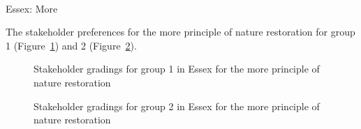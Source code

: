 \documentclass[
  12pt,
  letterpaper,
  DIV=11,
  numbers=noendperiod]{scrartcl}
\makeatletter
\let\oldparagraph\paragraph
\renewcommand{\paragraph}{
    \@ifstar
      \xxxParagraphStar
      \xxxParagraphNoStar
  }
\newcommand{\xxxParagraphStar}[1]{\oldparagraph*{#1}\mbox{}}
\newcommand{\xxxParagraphNoStar}[1]{\oldparagraph{#1}\mbox{}}
\makeatother
\begin{document}
\newpage{}

\paragraph{Essex: More}\label{essex-more}

The stakeholder preferences for the more principle of nature restoration
for group 1 (Figure~\ref{fig-EsMoreG1}) and 2
(Figure~\ref{fig-EsMoreG2}).

\begin{figure}[H]


\caption{\label{fig-EsMoreG1}Stakeholder gradings for group 1 in Essex
for the more principle of nature restoration}

\end{figure}%

\begin{figure}[H]


\caption{\label{fig-EsMoreG2}Stakeholder gradings for group 2 in Essex
for the more principle of nature restoration}

\end{figure}%
\end{document}
